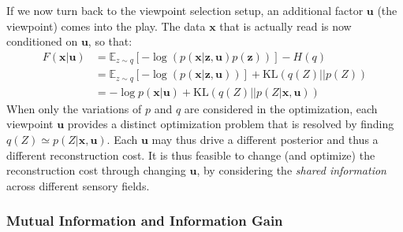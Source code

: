 \documentclass[12pt,twoside,openright]{article}
\begin{document}
If we now turn back to the viewpoint selection setup, an additional factor $\boldsymbol{u}$ (the viewpoint) comes into the play. The data $\boldsymbol{x}$ that is actually read is now conditioned on  $\boldsymbol{u}$, so that:
\begin{align}
F(\boldsymbol{x}|\boldsymbol{u}) 
&= \mathbb{E}_{z\sim q} \left[-\log (p(\boldsymbol{x}|\boldsymbol{z},\boldsymbol{u})p(\boldsymbol{z}))\right] - H(q)\\
&= \mathbb{E}_{z\sim q} \left[-\log (p(\boldsymbol{x}|\boldsymbol{z},\boldsymbol{u}))\right] +\text{KL}(q(Z)||p(Z))
\label{eq:FEP-prior-u}\\
&= - \log p(\boldsymbol{x}|\boldsymbol{u}) + \text{KL}(q(Z)||p(Z|\boldsymbol{x}, \boldsymbol{u}))
\label{eq:FEP-posterior-u}\end{align}
When only the variations of $p$ and $q$ are considered in the optimization, each viewpoint $\boldsymbol{u}$ provides a distinct optimization problem that is resolved by finding $q(Z)\simeq p(Z|\boldsymbol{x}, \boldsymbol{u})$. Each $\boldsymbol{u}$ may thus drive a different posterior and thus a different reconstruction cost. It is thus feasible to change (and optimize) the reconstruction cost through changing $\boldsymbol{u}$, by considering the \emph{shared information} across different
sensory fields.

\subsubsection{Mutual Information and Information Gain}
\end{document}
